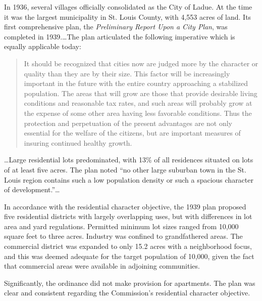


In 1936, several villages officially consolidated as the City of Ladue. At the
time it was the largest municipality in St. Louis County, with 4,553 acres of
land. Its first comprehensive plan, the \textit{Preliminary Report Upon a City
Plan}, was completed in 1939.\ldots The plan articulated the following
imperative which is equally applicable today:
\begin{quote}
It should be recognized that cities now are judged more by the character or
quality than they are by their size. This factor will be increasingly important
in the future with the entire country approaching a stabilized population. The
areas that will grow are those that provide desirable living conditions and
reasonable tax rates, and such areas will probably grow at the expense of some
other area having less favorable conditions. Thus the protection and
perpetuation of the present advantages are not only essential for the welfare of
the citizens, but are important measures of insuring continued healthy growth.
\end{quote}

\ldots Large residential lots predominated, with 13\% of all residences situated
on lots of at least five acres. The plan noted ``no other large suburban town in
the St. Louis region contains such a low population density or such a spacious
character of development.''\ldots

In accordance with the residential character objective, the 1939 plan proposed
five residential districts with largely overlapping uses, but with differences
in lot area and yard regulations. Permitted minimum lot sizes ranged from 10,000
square feet to three acres. Industry was confined to grandfathered areas. The
commercial district was expanded to only 15.2 acres with a neighborhood focus,
and this was deemed adequate for the target population of 10,000, given the fact
that commercial areas were available in adjoining communities.

Significantly, the ordinance did not make provision for apartments. The plan was
clear and consistent regarding the Commission's residential character objective.

